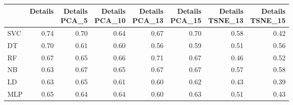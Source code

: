 \documentclass[12pt,italian]{report}
\begin{document}
\begin{table}[h]
	\begin{center}
		\begin{adjustbox}{max width=\textwidth}
			\begin{tabular}{lrrrrrrr}
				\toprule
				{} &   Details &  \thead{Details\\PCA\_5} &  \thead{Details\\PCA\_10} &  \thead{Details\\PCA\_13} &  \thead{Details\\PCA\_15} &  \thead{Details\\TSNE\_13} &  \thead{Details\\TSNE\_15} \\
				\midrule
				SVC &  0.74 &                  0.70 &                   0.64 &                   0.67 &                   0.70 &                    0.58 &                    0.42 \\
				DT  &  \cellcolor{cyan}0.70 &                  0.61 &                   0.60 &                   0.56 &                   0.59 &                    0.51 &                    0.56 \\
				RF  &  0.67 &                  0.65 &                   0.66 &                   \cellcolor{cyan}0.71 &                   0.67 &                    0.46 &                    0.52 \\
				NB  &  0.63 &                  0.67 &                   0.65 &                   0.67 &                   0.67 &                    0.57 &                    0.58 \\
				LD  &  0.63 &                  0.65 &                   0.61 &                   0.60 &                   0.62 &                    0.43 &                    0.39 \\
				MLP &  0.65 &                  0.64 &                   0.64 &                   0.60 &                   0.63 &                    0.51 &                    0.43 \\
				\bottomrule
			\end{tabular}
		\end{adjustbox}
	\end{center}
\end{table}
\end{document}
